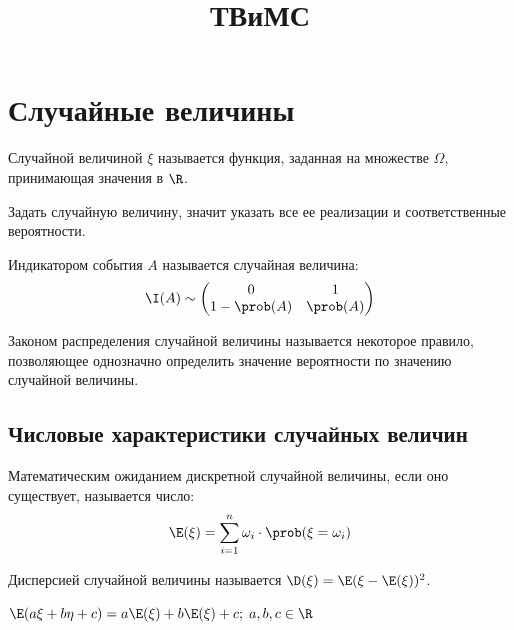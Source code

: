 \documentclass[12pt]{article}
\title{\textbf{ТВиМС}}\date{}\author{}
\begin{document}
\maketitle
\tableofcontents
\label{toc}
\newpage

\section{Случайные величины}

\begin{definition}
    Случайной величиной $\xi$ называется функция, заданная на множестве $\Omega$, принимающая значения в $\R$.
\end{definition}

    Задать случайную величину, значит указать все ее реализации и соответственные вероятности.

\begin{definition}
    Индикатором события $A$ называется случайная величина:
    $$\I(A)\sim \begin{pmatrix}
        0 & 1\\
        1-\prob(A) & \prob(A)
    \end{pmatrix}$$
\end{definition}

\begin{definition}
    Законом распределения случайной величины называется некоторое правило, позволяющее однозначно определить значение вероятности по значению случайной величины.
\end{definition}

    \subsection{Числовые характеристики случайных величин}

\begin{definition}
    Математическим ожиданием дискретной случайной величины, если оно существует, называется число: 
    $$\E (\xi)=\sum_{i=1}^{n}\omega_i\cdot \prob(\xi=\omega_i)$$
\end{definition}

\begin{definition}
    Дисперсией случайной величины называется $\D(\xi)=\E(\xi-\E(\xi))^2$.
\end{definition}

\begin{theorem}
    $\E(a\xi+b\eta+c)=a\E(\xi)+b\E(\xi)+c;\;a,b,c\in \R$
\end{theorem}
\end{document}
